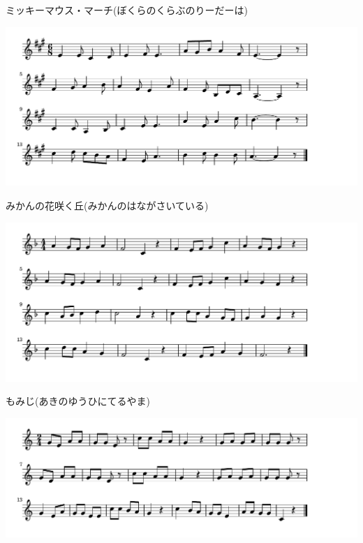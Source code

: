 \documentclass[a4paper]{ltjsarticle}
\begin{document}
\vspace{-10mm} \hspace{10mm}
ミッキーマウス・マーチ(ぼくらのくらぶのりーだーは)


\includegraphics[clip]{mikan_crop.pdf}

\vspace{-10mm} \hspace{10mm}
みかんの花咲く丘(みかんのはながさいている)



\includegraphics[clip]{momiji_crop.pdf}

\vspace{-10mm} \hspace{10mm}
もみじ(あきのゆうひにてるやま)



\includegraphics[clip]{mushinokoe_crop.pdf}
\end{document}
